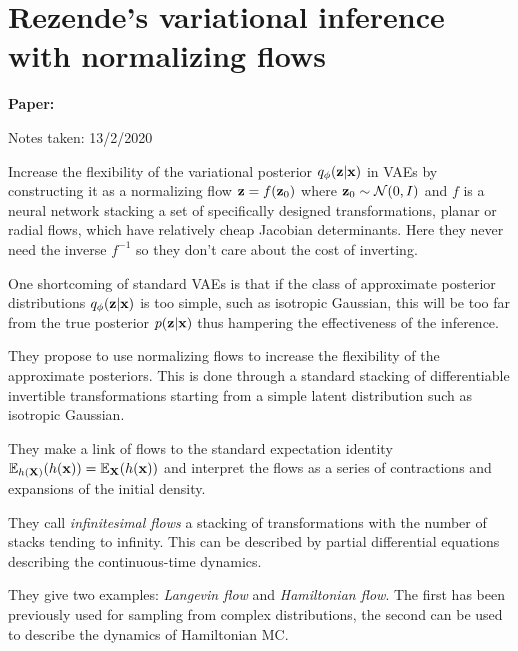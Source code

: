 \clearpage

\section{Rezende's variational inference with normalizing flows}

\begin{notebox}
\textbf{Paper: } 

\hfill Notes taken: 13/2/2020 
\end{notebox}

\begin{notebox}
\tldr Increase the flexibility of the variational posterior $q_{\phi}(\mathbf{z} | \mathbf{x})$ in VAEs by constructing it as a normalizing flow $\mathbf{z} = f(\mathbf{z}_0)$ where $\mathbf{z}_0 \sim \mathcal{N}(0, I)$ and $f$ is a neural network stacking a set of specifically designed transformations, planar or radial flows, which have relatively cheap Jacobian determinants. Here they never need the inverse $f^{-1}$ so they don't care about the cost of inverting.
\end{notebox}

One shortcoming of standard VAEs is that if the class of approximate posterior distributions $q_{\phi}(\mathbf{z} | \mathbf{x})$ is too simple, such as isotropic Gaussian, this will be too far from the true posterior $p(\mathbf{z} | \mathbf{x})$ thus hampering the effectiveness of the inference.

They propose to use normalizing flows to increase the flexibility of the approximate posteriors.
This is done through a standard stacking of differentiable invertible transformations starting from a simple latent distribution such as isotropic Gaussian.

They make a link of flows to the standard expectation identity $\mathbb{E}_{h(\mathbf{X})}(h(\mathbf{x})) = \mathbb{E}_{\mathbf{X}}(h(\mathbf{x}))$ and interpret the flows as a series of contractions and expansions of the initial density.

They call \emph{infinitesimal flows} a stacking of transformations with the number of stacks tending to infinity.
This can be described by partial differential equations describing the continuous-time dynamics.

They give two examples: \emph{Langevin flow} and \emph{Hamiltonian flow}. The first has been previously used for sampling from complex distributions, the second can be used to describe the dynamics of Hamiltonian MC. 

